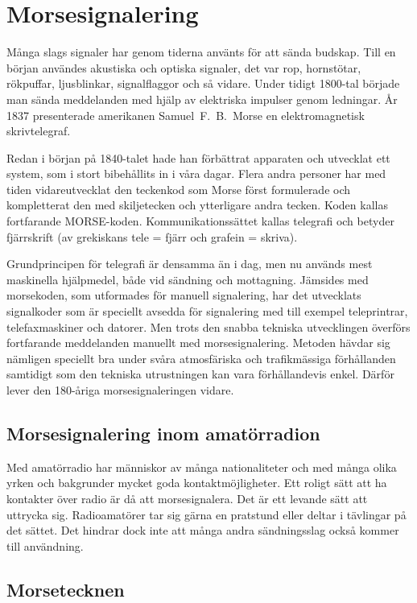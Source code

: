 \chapter{Morsesignalering}

Många slags signaler har genom tiderna använts för att sända budskap.
Till en början användes akustiska och optiska signaler, det var rop, hornstötar,
rökpuffar, ljusblinkar, signalflaggor och så vidare.
Under tidigt 1800-tal började man sända meddelanden med hjälp av elektriska
impulser genom ledningar.
År 1837 presenterade amerikanen Samuel~F.~B.~Morse en elektromagnetisk
skrivtelegraf.

Redan i början på 1840-talet hade han förbättrat apparaten och utvecklat ett
system, som i stort bibehållits in i våra dagar.
Flera andra personer har med tiden vidareutvecklat den teckenkod som Morse
först formulerade och kompletterat den med skiljetecken och ytterligare andra
tecken.
Koden kallas fortfarande MORSE-koden.
Kommunikationssättet kallas telegrafi och betyder fjärrskrift (av grekiskans
tele = fjärr och grafein = skriva).

Grundprincipen för telegrafi är densamma än i dag, men nu används mest
maskinella hjälpmedel, både vid sändning och mottagning.
Jämsides med morsekoden, som utformades för manuell signalering, har det
utvecklats signalkoder som är speciellt avsedda för signalering med till exempel
teleprintrar, telefaxmaskiner och datorer.
Men trots den snabba tekniska utvecklingen överförs fortfarande meddelanden
manuellt med morsesignalering.
Metoden hävdar sig nämligen speciellt bra under svåra atmosfäriska och
trafikmässiga förhållanden samtidigt som den tekniska utrustningen kan vara
förhållandevis enkel.
Därför lever den 180-åriga morsesignaleringen vidare.

\section[Morsesignalering]{Morsesignalering inom amatörradion}

Med amatörradio har människor av många nationaliteter och med många olika yrken
och bakgrunder mycket goda kontaktmöjligheter.
Ett roligt sätt att ha kontakter över radio är då att morsesignalera.
Det är ett levande sätt att uttrycka sig.
Radioamatörer tar sig gärna en pratstund eller deltar i tävlingar på det sättet.
Det hindrar dock inte att många andra sändningsslag också kommer till
användning.

\section{Morsetecknen}

